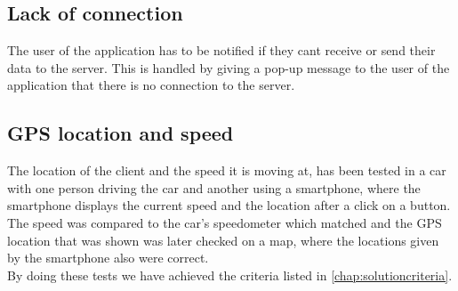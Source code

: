
\subsection{Lack of connection}
The user of the application has to be notified if they cant receive or send their data to the server. This is handled by giving a pop-up message to the user of the application that there is no connection to the server.

\subsection{GPS location and speed}
The location of the client and the speed it is moving at, has been tested in a car with one person driving the car and another using a smartphone, where the smartphone displays the current speed and the location after a click on a button. The speed was compared to the car's speedometer which matched and the GPS location that was shown was later checked on a map, where the locations given by the smartphone also were correct.
\\
By doing these tests we have achieved the criteria listed in \autoref{chap:solutioncriteria}.

